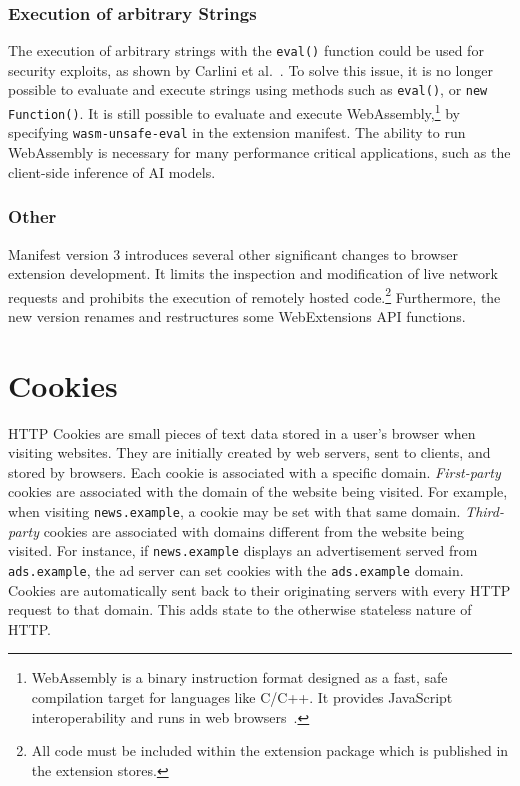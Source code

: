\subsubsection{Execution of arbitrary Strings}
The execution of arbitrary strings with the \texttt{eval()} function could be used for security exploits, as shown by Carlini et al.~\cite{carlini2012evaluation}.
To solve this issue, it is no longer possible to evaluate and execute strings using methods such as \texttt{eval()}, or \texttt{new Function()}.
It is still possible to evaluate and execute WebAssembly,\footnote{WebAssembly is a binary instruction format designed as a fast, safe compilation target for languages like C/C++. It provides JavaScript interoperability and runs in web browsers~\cite{haas2017wasm}.} by specifying \texttt{wasm-unsafe-eval} in the extension manifest.
The ability to run WebAssembly is necessary for many performance critical applications, such as the client-side inference of AI models.

\subsubsection{Other}
Manifest version 3 introduces several other significant changes to browser extension development.
It limits the inspection and modification of live network requests and prohibits the execution of remotely hosted code.\footnote{
All code must be included within the extension package which is published in the extension stores.
}
Furthermore, the new version renames and restructures some WebExtensions API functions.

\section{Cookies}
HTTP Cookies are small pieces of text data stored in a user's browser when visiting websites. 
They are initially created by web servers, sent to clients, and stored by browsers. 
Each cookie is associated with a specific domain.
\emph{First-party} cookies are associated with the domain of the website being visited.
For example, when visiting \texttt{news.example}, a cookie may be set with that same domain.
\emph{Third-party} cookies are associated with domains different from the website being visited. 
For instance, if \texttt{news.example} displays an advertisement served from \texttt{ads.example}, the ad server can set cookies with the \texttt{ads.example} domain.
Cookies are automatically sent back to their originating servers with every HTTP request to that domain. 
This adds state to the otherwise stateless nature of HTTP.

